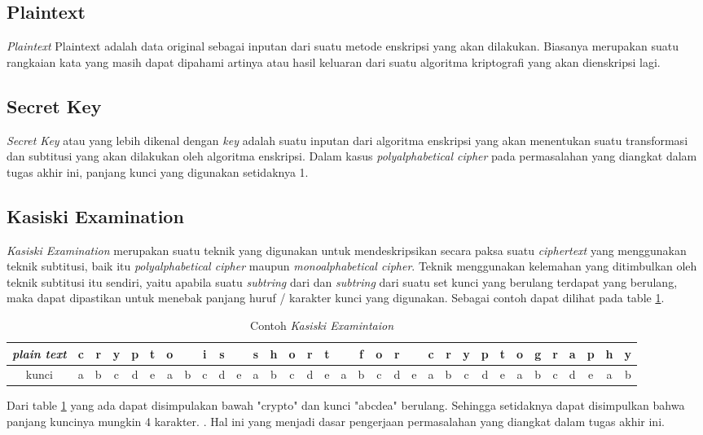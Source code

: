	\subsection{Plaintext}
	\textit{Plaintext} Plaintext adalah data original sebagai inputan dari suatu metode enskripsi yang akan dilakukan\cite{william_crytography_2011}. Biasanya merupakan suatu rangkaian kata yang masih dapat dipahami artinya atau hasil keluaran dari suatu algoritma kriptografi yang akan dienskripsi lagi.
	
	\subsection{Secret Key}
	\textit{Secret Key} atau yang lebih dikenal dengan \textit{key} adalah suatu inputan dari algoritma enskripsi yang akan menentukan suatu transformasi dan subtitusi yang akan dilakukan oleh algoritma enskripsi\cite{william_crytography_2011}. Dalam kasus \textit{polyalphabetical cipher} pada permasalahan yang diangkat dalam tugas akhir ini, panjang kunci yang digunakan setidaknya 1. 
	
	 \subsection{Kasiski Examination}
	 \textit{Kasiski Examination} merupakan suatu teknik yang digunakan untuk mendeskripsikan secara paksa suatu \textit{ciphertext} yang menggunakan teknik subtitusi, baik itu \textit{polyalphabetical cipher} maupun \textit{monoalphabetical cipher}. Teknik menggunakan kelemahan yang ditimbulkan oleh teknik subtitusi itu sendiri, yaitu apabila suatu \textit{subtring} dari \plaintext dan \textit{subtring} dari suatu set kunci yang berulang terdapat yang berulang, maka dapat dipastikan untuk menebak panjang huruf / karakter kunci yang digunakan. Sebagai contoh dapat dilihat pada table \ref{tab:kasiski examination}.
	 \begin{table}[H]
		\centering
		\begin{tabular}   {|c|c|c|c|c|c|c|c|c|c|c|c|c|c|c|c|c|c|c|c|c|c|c|c|c|c|c|c|c|c|c|c|c|}\hline
		\textit{plain text}&c&r&y&p&t&o& &i&s& &s&h&o&r&t& &f&o&r& &c&r&y&p&t&o&g&r&a&p&h&y\\ \hline
		kunci&a&b&c&d&e&a&b&c&d&e&a&b&c&d&e&a&b&c&d&e&a&b&c&d&e&a&b&c&d&e&a&b\\ \hline
		\end{tabular}
		\caption{Contoh \textit{Kasiski Examintaion}}
		\label{tab:kasiski examination}
	\end{table}
	Dari table \ref{tab:kasiski examination} yang ada dapat disimpulakan bawah \plaintext "crypto" dan kunci "abcdea" berulang. Sehingga setidaknya dapat disimpulkan bahwa panjang kuncinya mungkin 4 karakter. \cite{noauthor_kasiski_nodate}. Hal ini yang menjadi dasar pengerjaan permasalahan yang diangkat dalam tugas akhir ini.
